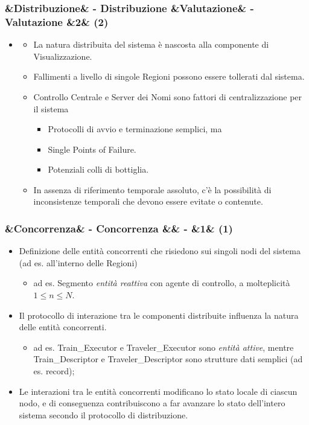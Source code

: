 \documentclass[slidestop,compress,blackandwhite]{beamer}
\newcommand{\ii}[1]{\textit{#1}}
\newcommand{\cm}[1]{\vspace{#1cm}}
\newcommand{\newtitle}[4]{
	#1 
	\ifx&#2&%
	\else
  		\large- #2
	\fi
	\ifx&#3&%
	\else
  		\small- #3
	\fi
	\ifx&#4&%
	\else
  		\normalsize (#4)
	\fi
}
\newcommand{\newframe}[5]{
	\begin{frame}
		\frametitle{\newtitle{#1}{#2}{#3}{#4}}
		#5
	\end{frame}
}
\newcommand{\myitemize}[1]{
	\begin{itemize}\itemsep4pt
	#1
	\end{itemize}
}
\begin{document}
	\newframe{}{Distribuzione}{Valutazione}{2}{
		\myitemize {
			\item[] %
				\myitemize {
						\item La natura distribuita del sistema è nascosta alla componente di Visualizzazione.
						\item Fallimenti a livello di singole Regioni possono essere tollerati dal sistema.
						\item Controllo Centrale e Server dei Nomi sono fattori di centralizzazione per il sistema \\
							\myitemize {
								\item Protocolli di avvio e terminazione semplici, ma
								\item Single Points of Failure.
								\item Potenziali colli di bottiglia.
							}
						
						\item In assenza di riferimento temporale assoluto, c'è la possibilità di inconsistenze temporali che devono essere evitate o contenute.
						
				}
		}
	}
	
	
	\newframe{}{Concorrenza}{}{1}{
		\justifying
		\cm{0.3}
		\myitemize {
			\item Definizione delle entità concorrenti che risiedono sui singoli nodi del sistema (ad es. all'interno delle Regioni)
			\myitemize{
					\item ad es. Segmento {\em entità reattiva} con agente di controllo, a molteplicità $1\le n\le N$.
				}
			\item Il protocollo di interazione tra le componenti distribuite influenza la natura delle entità concorrenti.
				\myitemize {
					\item ad es. Train\_Executor e Traveler\_Executor sono {\em entità attive}, mentre Train\_Descriptor e Traveler\_Descriptor sono strutture dati semplici (ad es. record);
				}	
			\item \justifying Le interazioni tra le entità concorrenti modificano lo stato locale di ciascun nodo, e di conseguenza contribuiscono a far avanzare lo stato dell'intero sistema secondo il protocollo di distribuzione.
		}
	}
	
\end{document}
